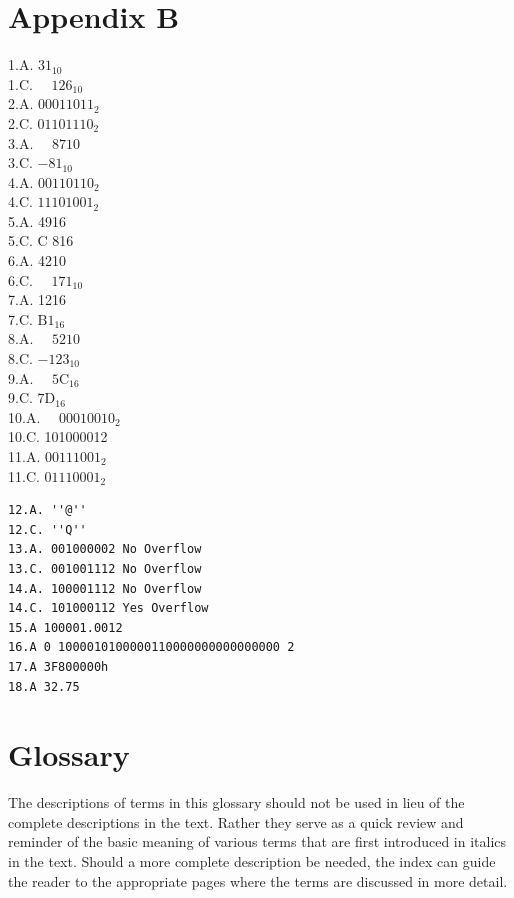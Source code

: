\documentclass[10pt]{article}
\begin{document}
\section*{Appendix B}
1.A. $31_{10}$\\
1.C. $\quad 126_{10}$\\
2.A. $00011011_{2}$\\
2.C. $01101110_{2}$\\
3.A. $\quad 8710$\\
3.C. $-81_{10}$\\
4.A. $00110110_{2}$\\
4.C. $11101001_{2}$\\
5.A. 4916\\
5.C. C 816\\
6.A. 4210\\
6.C. $\quad 171_{10}$\\
7.A. 1216\\
7.C. $\mathrm{B} 1_{16}$\\
8.A. $\quad 5210$\\
8.C. $-123_{10}$\\
9.A. $\quad 5 \mathrm{C}_{16}$\\
9.C. $7 \mathrm{D}_{16}$\\
10.A. $\quad 00010010_{2}$\\
10.C. 101000012\\
11.A. $00111001_{2}$\\
11.C. $01110001_{2}$

\begin{verbatim}
12.A. ''@''
12.C. ''Q''
13.A. 001000002 No Overflow
13.C. 001001112 No Overflow
14.A. 100001112 No Overflow
14.C. 101000112 Yes Overflow
15.A 100001.0012
16.A 0 1000010100000110000000000000000 2
17.A 3F800000h
18.A 32.75
\end{verbatim}

\section*{Glossary}
The descriptions of terms in this glossary should not be used in lieu of the complete descriptions in the text. Rather they serve as a quick review and reminder of the basic meaning of various terms that are first introduced in italics in the text. Should a more complete description be needed, the index can guide the reader to the appropriate pages where the terms are discussed in more detail.
\end{document}
